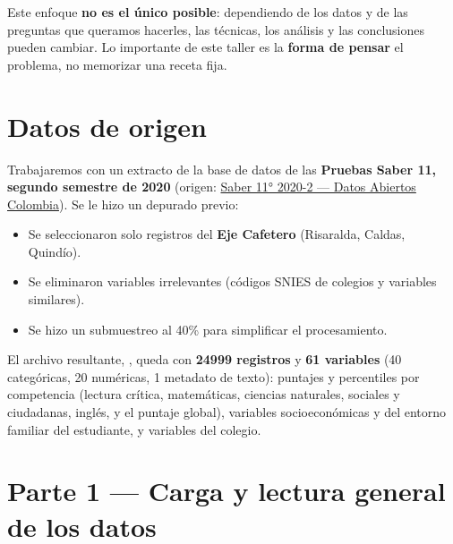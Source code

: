 \documentclass[11pt,letterpaper]{article}
\begin{document}
\begin{nota}
Este enfoque \textbf{no es el único posible}: dependiendo de los datos y de las preguntas que queramos hacerles, las técnicas, los análisis y las conclusiones pueden cambiar. Lo importante de este taller es la \textbf{forma de pensar} el problema, no memorizar una receta fija.
\end{nota}

\section{Datos de origen}

Trabajaremos con un extracto de la base de datos de las \textbf{Pruebas Saber 11, segundo semestre de 2020} (origen: \href{https://www.datos.gov.co/Educaci-n/Resultados-nicos-Saber-11/kgxf-xxbg}{Saber 11° 2020-2 --- Datos Abiertos Colombia}). Se le hizo un depurado previo:

\begin{itemize}[leftmargin=1.2cm]
  \item Se seleccionaron solo registros del \textbf{Eje Cafetero} (Risaralda, Caldas, Quindío).
  \item Se eliminaron variables irrelevantes (códigos SNIES de colegios y variables similares).
  \item Se hizo un submuestreo al 40\% para simplificar el procesamiento.
\end{itemize}

El archivo resultante, \texttt{\protect{}}, queda con \textbf{24999 registros} y \textbf{61 variables} (40 categóricas, 20 numéricas, 1 metadato de texto): puntajes y percentiles por competencia (lectura crítica, matemáticas, ciencias naturales, sociales y ciudadanas, inglés, y el puntaje global), variables socioeconómicas y del entorno familiar del estudiante, y variables del colegio.

\section{Parte 1 --- Carga y lectura general de los datos}
\end{document}

